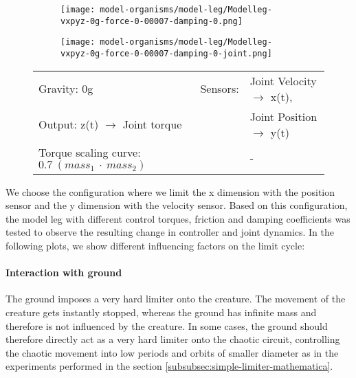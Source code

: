 \documentclass[main]{subfiles}
\begin{document}
\begin{figure}[H]
	\centering
		\begin{subfigure}[c]{0.45\textwidth}
	\texttt{[image: model-organisms/model-leg/Modelleg-vxpyz-0g-force-0-00007-damping-0.png]}
		\end{subfigure}
	\begin{subfigure}[c]{0.45\textwidth}
	\texttt{[image: model-organisms/model-leg/Modelleg-vxpyz-0g-force-0-00007-damping-0-joint.png]}
		\end{subfigure}
	\caption[Limited chaotic controller controlling model leg]{}
	\begin{tabular}{l|ll}
	\hline 
	Gravity: 0g  & Sensors: & Joint Velocity \(\rightarrow\) x(t),\\
	 Output: z(t) \(\rightarrow\) Joint torque & & Joint Position \(\rightarrow\) y(t) \\
	  Torque scaling curve: \(0.7~(mass_1~\cdot~mass_2)\) & & - \\
	  \hline
	\end{tabular}

	\label{figure:limited-model-leg6}
\end{figure}

We choose the configuration where we limit the x dimension with the position sensor and the y dimension with the velocity sensor. Based on this configuration, the model leg with different control torques, friction and damping coefficients was tested to observe the resulting change in controller and joint dynamics. In the following plots, we show different influencing factors on the limit cycle:

\paragraph{Interaction with ground} The ground imposes a very hard limiter onto the creature. The movement of the creature gets instantly stopped, whereas the ground has infinite mass and therefore is not influenced by the creature. In some cases, the ground should therefore directly act as a very hard limiter onto the chaotic circuit, controlling the chaotic movement into low periods and orbits of smaller diameter as in the experiments performed in the section \ref{subsubsec:simple-limiter-mathematica}. 
\end{document}
